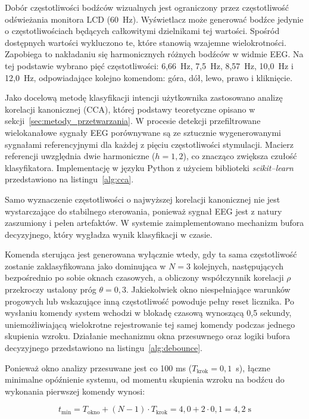 Dobór częstotliwości bodźców wizualnych jest ograniczony przez częstotliwość odświeżania monitora LCD (60~Hz).
Wyświetlacz może generować bodźce jedynie o częstotliwościach będących całkowitymi dzielnikami tej wartości.
Spośród dostępnych wartości wykluczono te, które stanowią wzajemne wielokrotności. Zapobiega to nakładaniu się harmonicznych różnych bodźców w widmie EEG.
Na tej podstawie wybrano pięć częstotliwości: 6,66~Hz, 7,5~Hz, 8,57~Hz, 10,0~Hz i 12,0~Hz, odpowiadające kolejno komendom: góra, dół, lewo, prawo i kliknięcie.

Jako docelową metodę klasyfikacji intencji użytkownika zastosowano analizę 
korelacji kanonicznej (CCA), której podstawy teoretyczne opisano 
w sekcji~\ref{sec:metody_przetwarzania}. W procesie detekcji przefiltrowane 
wielokanałowe sygnały EEG porównywane są ze sztucznie wygenerowanymi sygnałami 
referencyjnymi dla każdej z pięciu częstotliwości stymulacji. Macierz referencji 
uwzględnia dwie harmoniczne ($h = 1, 2$), co znacząco zwiększa czułość 
klasyfikatora. Implementację w języku Python z użyciem biblioteki 
\textit{scikit--learn} przedstawiono na listingu~\ref{alg:cca}.

Samo wyznaczenie częstotliwości o najwyższej korelacji kanonicznej nie jest wystarczające do stabilnego sterowania, ponieważ sygnał EEG jest z natury zaszumiony i pełen artefaktów.
W systemie zaimplementowano mechanizm bufora decyzyjnego, który wygładza wynik klasyfikacji w czasie.

Komenda sterująca jest generowana wyłącznie wtedy, gdy ta sama częstotliwość zostanie zaklasyfikowana jako dominująca w $N = 3$ kolejnych, następujących bezpośrednio po sobie oknach czasowych, a obliczony współczynnik korelacji $\rho$ przekroczy ustalony próg $\theta = 0{,}3$.
Jakiekolwiek okno niespełniające warunków progowych lub wskazujące inną częstotliwość powoduje pełny reset licznika.
Po wysłaniu komendy system wchodzi w blokadę czasową wynoszącą 0,5 sekundy, uniemożliwiającą wielokrotne rejestrowanie tej samej komendy podczas jednego skupienia wzroku. Działanie mechanizmu okna przesuwnego oraz logiki bufora decyzyjnego przedstawiono na listingu~\ref{alg:debounce}.



Ponieważ okno analizy przesuwane jest co 100 ms ($T_{\text{krok}} = 0{,}1$~s), łączne minimalne opóźnienie systemu, od momentu skupienia wzroku na bodźcu do wykonania pierwszej komendy wynosi:

\begin{equation}
    t_{\min} = T_{\text{okno}} + (N-1) \cdot T_{\text{krok}} = 4{,}0 + 2 \cdot 0{,}1 = 4{,}2 \; \text{s}
    \label{eq:delay}
\end{equation}

